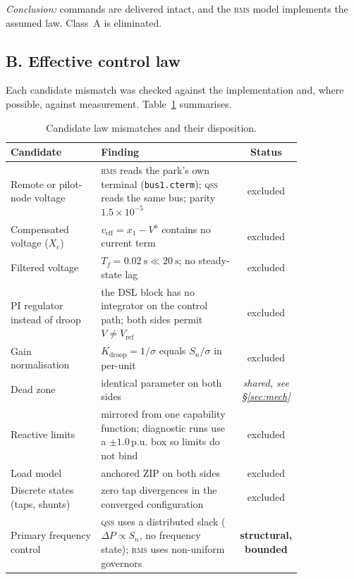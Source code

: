 \documentclass[11pt,a4paper]{article}
\newcommand{\pu}{\ensuremath{\mathrm{p.u.}}}
\newcommand{\qss}{\textsc{qss}}
\newcommand{\rms}{\textsc{rms}}
\begin{document}
\emph{Conclusion:} commands are delivered intact, and the \rms{} model
implements the assumed law. Class~A is eliminated.

\subsection{B. Effective control law}

Each candidate mismatch was checked against the implementation and, where
possible, against measurement. Table~\ref{tab:law} summarises.

\begin{table}[htbp]
  \centering
  \caption{Candidate law mismatches and their disposition.}
  \label{tab:law}
  \begin{tabular}{p{0.32\linewidth}p{0.50\linewidth}c}
    \toprule
    Candidate & Finding & Status \\
    \midrule
    Remote or pilot-node voltage &
    \rms{} reads the park's own terminal (\texttt{bus1.cterm}); \qss{} reads
    the same bus; parity $1.5\times10^{-5}$ & excluded \\
    Compensated voltage ($X_c$) &
    $v_{\mathrm{eff}} = x_1 - V^{\mathrm{a}}$ contains no current term &
    excluded \\
    Filtered voltage &
    $T_f = \SI{0.02}{\second} \ll \SI{20}{\second}$; no steady-state lag &
    excluded \\
    PI regulator instead of droop &
    the DSL block has no integrator on the control path; both sides permit
    $V \neq V_{\mathrm{ref}}$ & excluded \\
    Gain normalisation &
    $K_{\mathrm{droop}} = 1/\sigma$ equals $S_n/\sigma$ in per-unit &
    excluded \\
    Dead zone &
    identical parameter on both sides & \emph{shared, see \S\ref{sec:mech}} \\
    Reactive limits &
    mirrored from one capability function; diagnostic runs use a
    $\pm1.0\,\pu$ box so limits do not bind & excluded \\
    Load model &
    anchored ZIP on both sides & excluded \\
    Discrete states (taps, shunts) &
    zero tap divergences in the converged configuration & excluded \\
    Primary frequency control &
    \qss{} uses a distributed slack ($\Delta P \propto S_n$, no frequency
    state); \rms{} uses non-uniform governors & \textbf{structural,
    bounded} \\
    \bottomrule
  \end{tabular}
\end{table}
\end{document}
